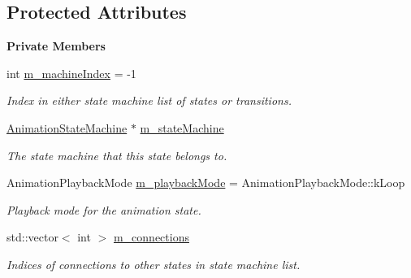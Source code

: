 \subsection*{Protected Attributes}
\begin{Indent}\textbf{ Private Members}\par
\begin{DoxyCompactItemize}
\item 
\mbox{\label{classrev_1_1_base_animation_state_a660681d515ed4cad3619d85b98b3a26b}} 
int \mbox{\hyperlink{classrev_1_1_base_animation_state_a660681d515ed4cad3619d85b98b3a26b}{m\+\_\+machine\+Index}} = -\/1
\begin{DoxyCompactList}\small\item\em Index in either state machine list of states or transitions. \end{DoxyCompactList}\item 
\mbox{\label{classrev_1_1_base_animation_state_a8090985517009da201cca3c2a225bbb6}} 
\mbox{\hyperlink{classrev_1_1_animation_state_machine}{Animation\+State\+Machine}} $\ast$ \mbox{\hyperlink{classrev_1_1_base_animation_state_a8090985517009da201cca3c2a225bbb6}{m\+\_\+state\+Machine}}
\begin{DoxyCompactList}\small\item\em The state machine that this state belongs to. \end{DoxyCompactList}\item 
\mbox{\label{classrev_1_1_base_animation_state_a8724d5193b6e19ef97347f77dd751fb8}} 
Animation\+Playback\+Mode \mbox{\hyperlink{classrev_1_1_base_animation_state_a8724d5193b6e19ef97347f77dd751fb8}{m\+\_\+playback\+Mode}} = Animation\+Playback\+Mode\+::k\+Loop
\begin{DoxyCompactList}\small\item\em Playback mode for the animation state. \end{DoxyCompactList}\item 
\mbox{\label{classrev_1_1_base_animation_state_a461c74130f9380f66ca86c79643eaa72}} 
std\+::vector$<$ int $>$ \mbox{\hyperlink{classrev_1_1_base_animation_state_a461c74130f9380f66ca86c79643eaa72}{m\+\_\+connections}}
\begin{DoxyCompactList}\small\item\em Indices of connections to other states in state machine list. \end{DoxyCompactList}\end{DoxyCompactItemize}
\end{Indent}
